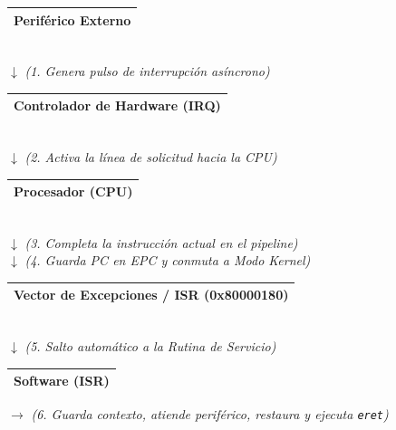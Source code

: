 \documentclass[12pt,a4paper]{article}
\begin{document}
\begin{center}
\small
\setlength{\tabcolsep}{12pt}
\renewcommand{\arraystretch}{1.2}
\begin{tabular}{|c|}
    \hline
    \textbf{Periférico Externo} \\
    \hline
\end{tabular} \\[0.15cm]
$\downarrow$ \textit{\scriptsize (1. Genera pulso de interrupción asíncrono)} \\[0.15cm]
\begin{tabular}{|c|}
    \hline
    \textbf{Controlador de Hardware (IRQ)} \\
    \hline
\end{tabular} \\[0.15cm]
$\downarrow$ \textit{\scriptsize (2. Activa la línea de solicitud hacia la CPU)} \\[0.15cm]
\begin{tabular}{|c|}
    \hline
    \textbf{Procesador (CPU)} \\
    \hline
\end{tabular} \\[0.15cm]
$\downarrow$ \textit{\scriptsize (3. Completa la instrucción actual en el pipeline)} \\[0.1cm]
$\downarrow$ \textit{\scriptsize (4. Guarda PC en EPC y conmuta a Modo Kernel)} \\[0.15cm]
\begin{tabular}{|c|}
    \hline
    \textbf{Vector de Excepciones / ISR (0x80000180)} \\
    \hline
\end{tabular} \\[0.15cm]
$\downarrow$ \textit{\scriptsize (5. Salto automático a la Rutina de Servicio)} \\[0.15cm]
\begin{tabular}{|c|}
    \hline
    \textbf{Software (ISR)} \\
    \hline
\end{tabular} $\longrightarrow$ \textit{\scriptsize (6. Guarda contexto, atiende periférico, restaura y ejecuta \texttt{eret})}
\end{center}
\end{document}
